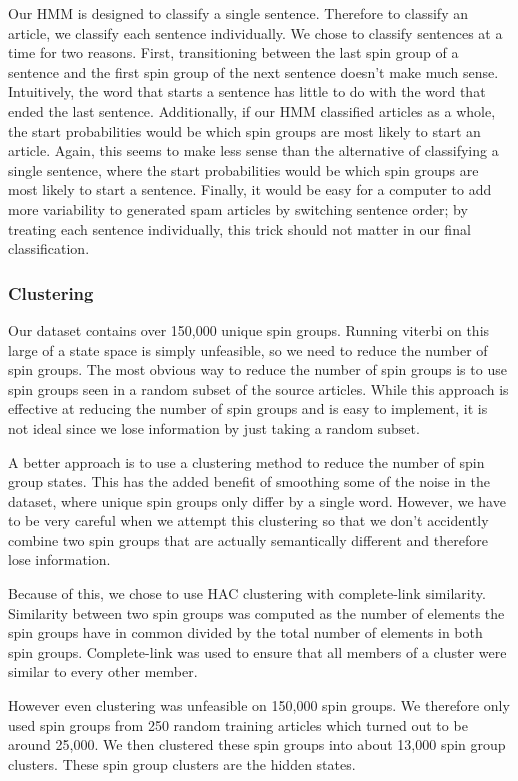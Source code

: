 \documentclass[11pt,letterpaper,oneside, titlepage]{scrartcl}
\begin{document}
Our HMM is designed to classify a single sentence. Therefore to classify an article, we classify each sentence individually. We chose to classify sentences at a time for two reasons. First, transitioning between the last spin group of a sentence and the first spin group of the next sentence doesn’t make much sense. Intuitively, the word that starts a sentence has little to do with the word that ended the last sentence. Additionally, if our HMM classified articles as a whole, the start probabilities would be which spin groups are most likely to start an article. Again, this seems to make less sense than the alternative of classifying a single sentence, where the start probabilities would be which spin groups are most likely to start a sentence. Finally, it would be easy for a computer to add more variability to generated spam articles by switching sentence order; by treating each sentence individually, this trick should not matter in our final classification.

\subsubsection{Clustering}

Our dataset contains over 150,000 unique spin groups. Running viterbi on this large of a state space is simply unfeasible, so we need to reduce the number of spin groups. The most obvious way to reduce the number of spin groups is to use spin groups seen in a random subset of the source articles. While this approach is effective at reducing the number of spin groups and is easy to implement, it is not ideal since we lose information by just taking a random subset.

A better approach is to use a clustering method to reduce the number of spin group states. This has the added benefit of smoothing some of the noise in the dataset, where unique spin groups only differ by a single word. However, we have to be very careful when we attempt this clustering so that we don’t accidently combine two spin groups that are actually semantically different and therefore lose information.

Because of this, we chose to use HAC clustering with complete-link similarity. Similarity between two spin groups was computed as the number of elements the spin groups have in common divided by the total number of elements in both spin groups. Complete-link was used to ensure that all members of a cluster were similar to every other member.

However even clustering was unfeasible on 150,000 spin groups. We therefore only used spin groups from 250 random training articles which turned out to be around 25,000. We then clustered these spin groups into about 13,000 spin group clusters. These spin group clusters are the hidden states.
\end{document}
